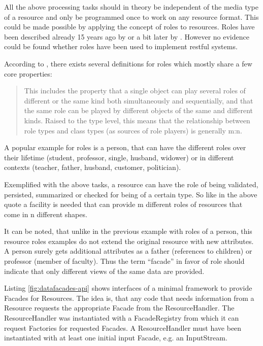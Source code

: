\documentclass[12pt,a4paper]{scrartcl}		%
\begin{document}
All the above processing tasks should in theory be independent of the media type
of a resource and only be programmed once to work on any resource format. This
could be made possible by applying the concept of roles to resources. Roles have
been described already 15 years ago by \cite{Fowler1997} or a bit later by
\cite{Baeumer2000}. However no evidence could be found whether roles have been
used to implement restful systems.

According to \cite{Steimann2008}, there exists several definitions for roles
which mostly share a few core properties:

\begin{quote}
  This includes the property that a single object can play several roles of
  different or the same kind both simultaneously and sequentially, and that the
  same role can be played by different objects of the same and different
  kinds. Raised to the type level, this means that the relationship between role
  types and class types (as sources of role players) is generally m:n.
\end{quote}

A popular example for roles is a person, that can have the different roles over
their lifetime (student, professor, single, husband, widower) or in different
contexts (teacher, father, husband, customer, politician).


Exemplified with the above tasks, a resource can have the role of being
validated, persisted, summarized or checked for being of a certain type. So like
in the above quote a facility is needed that can provide m different roles of
resources that come in n different shapes.

It can be noted, that unlike in the previous example with roles of a person,
this resource roles examples do not extend the original resource with new
attributes. A person surely gets additional attributes as a father (references
to children) or professor (member of faculty). Thus the term ``facade'' in favor
of role should indicate that only different views of the same data are provided.

Listing \ref{fig:datafacades-api} shows interfaces of a minimal framework to
provide Facades for Resources. The idea is, that any code that needs information
from a Resource requests the appropriate Facade from the ResourceHandler. The
ResourceHandler was instantiated with a FacadeRegistry from which it can request
Factories for requested Facades. A ResourceHandler must have been instantiated
with at least one initial input Facade, e.g. an InputStream.
\end{document}
